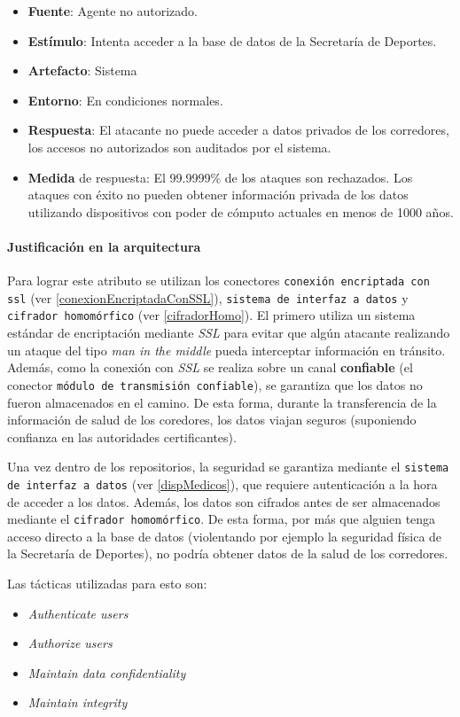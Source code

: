 \begin{itemize}
  \item \textbf{Fuente}: Agente no autorizado.
  \item \textbf{Estímulo}: Intenta acceder a la base de datos de la Secretaría de Deportes.
  \item \textbf{Artefacto}: Sistema
  \item \textbf{Entorno}: En condiciones normales.
  \item \textbf{Respuesta}: El atacante no puede acceder a datos privados de los corredores, los accesos no autorizados son auditados por el sistema.
  \item \textbf{Medida} de respuesta: El 99.9999\% de los ataques son rechazados. Los ataques con éxito no pueden obtener información privada de los datos utilizando dispositivos con poder de cómputo actuales en menos de 1000 años.
\end{itemize}

\paragraph{Justificación en la arquitectura}
Para lograr este atributo se utilizan los conectores \texttt{conexión encriptada con ssl} (ver \ref{conexionEncriptadaConSSL}),  \texttt{sistema de interfaz a datos} y \texttt{cifrador homomórfico} (ver \ref{cifradorHomo}). El primero utiliza un sistema estándar de encriptación mediante \emph{SSL} para evitar que algún atacante realizando un ataque del tipo \emph{man in the middle} pueda interceptar información en tránsito. Además, como la conexión con \emph{SSL} se realiza sobre un canal \textbf{confiable} (el conector \texttt{módulo de transmisión confiable}), se garantiza que los datos no fueron almacenados en el camino. De esta forma, durante la transferencia de la información de salud de los coredores, los datos viajan seguros (suponiendo confianza en las autoridades certificantes). 

Una vez dentro de los repositorios, la seguridad se garantiza mediante el \texttt{sistema de interfaz a datos} (ver \ref{dispMedicos}), que requiere autenticación a la hora de acceder a los datos. Además, los datos son cifrados antes de ser almacenados mediante el \texttt{cifrador homomórfico}. De esta forma, por más que alguien tenga acceso directo a la base de datos (violentando por ejemplo la seguridad física de la Secretaría de Deportes), no podría obtener datos de la salud de los corredores.

Las tácticas utilizadas para esto son:
\begin{itemize}
  \item \emph{Authenticate users}
  \item \emph{Authorize users}
  \item \emph{Maintain data confidentiality}
  \item \emph{Maintain integrity}
\end{itemize}


